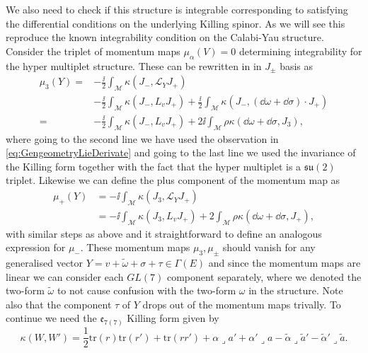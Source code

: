 We also need to check if this structure is integrable corresponding to satisfying the differential conditions on the underlying Killing spinor. As we will see this reproduce the known integrability condition on the Calabi-Yau structure. Consider the triplet of momentum maps $\mu_\alpha(V)=0$ determining integrability for the hyper multiplet structure. These can be rewritten in in $J_\pm$ basis as 
\begin{equation}
    \begin{aligned}
    \mu_3(Y)=& -\frac{\ii}{2}\int_\mathcal{M} \kappa(J_-,\mathscr{L}_YJ_+)\\
             &-\frac{\ii}{2}\int_\mathcal{M}\kappa(J_-,L_vJ_+)+\frac{\ii}{2}\int_\mathcal{M}\kappa(J_-,(\dd\omega+\dd\sigma)\cdot J_+)\\
            =& -\frac{\ii}{2}\int_\mathcal{M}\kappa(J_-,L_vJ_+)+2\ii  \int_\mathcal{M}\rho\kappa(\dd\omega+\dd\sigma,J_3),
    \end{aligned}
\end{equation}
where going to the second line we have used the observation in \eqref{eq:GengeometryLieDerivate} and going to the last line we used the invariance of the Killing form together with the fact that the hyper multiplet is a $\mathfrak{su}(2)$ triplet. Likewise we can define the plus component of the momentum map as 
\begin{equation}
    \begin{aligned}
    \mu_+(Y) &= -\ii\int_\mathcal{M}\kappa(J_3,\mathscr{L}_YJ_+)\\
          &= -\ii\int_\mathcal{M}\kappa(J_3,L_vJ_+)+2\int_\mathcal{M}\rho\kappa(\dd\omega+\dd\sigma,J_+),
    \end{aligned}
\end{equation}
with similar steps as above and it straightforward to define an analogous expression for $\mu_-$. These momentum maps $\mu_3,\mu_{\pm}$ should vanish for any generalised vector $Y=v+\tilde{\omega}+\sigma+\tau\in\Gamma(E)$ and since the momentum maps are linear we can consider each $GL(7)$ component separately, where we denoted the two-form $\tilde{\omega}$ to not cause confusion with the two-form $\omega$ in the structure. Note also that the component $\tau$ of $Y$ drops out of the momentum maps trivally. To continue we need the $\mathfrak{e}_{7(7)}$ Killing form given by 
\begin{equation}
    \kappa(W,W') = \frac{1}{2}\text{tr}(r)\text{tr}(r')+\text{tr}(rr')+\alpha \lrcorner a'+\alpha'\lrcorner a-\tilde{\alpha}\lrcorner \tilde{a}'-\tilde{\alpha}'\lrcorner \tilde{a}.
\end{equation}

